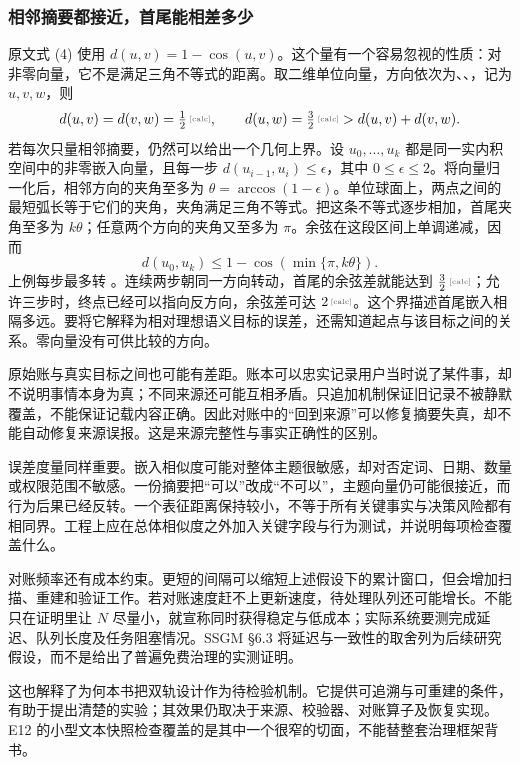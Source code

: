 \subsubsection{相邻摘要都接近，首尾能相差多少}

原文式 (4) 使用 $d(u,v)=1-\cos(u,v)$。这个量有一个容易忽视的性质：对非零向量，它不是满足三角不等式的距离。取二维单位向量，方向依次为、、，记为 $u,v,w$，则
\[
 d(u,v)=d(v,w)=\calcnum{\tfrac12},\qquad
 d(u,w)=\calcnum{\tfrac32}>d(u,v)+d(v,w).
\]
若每次只量相邻摘要，仍然可以给出一个几何上界。设 $u_0,\ldots,u_k$ 都是同一实内积空间中的非零嵌入向量，且每一步 $d(u_{i-1},u_i)\leq\epsilon$，其中 $0\leq\epsilon\leq 2$。将向量归一化后，相邻方向的夹角至多为 $\theta=\arccos(1-\epsilon)$。单位球面上，两点之间的最短弧长等于它们的夹角，夹角满足三角不等式\cite{schubert-cosine-2021}。把这条不等式逐步相加，首尾夹角至多为 $k\theta$；任意两个方向的夹角又至多为 $\pi$。余弦在这段区间上单调递减，因而
\[
 d(u_0,u_k)\leq 1-\cos\!\left(\min\{\pi,k\theta\}\right).
\]
上例每步最多转 。连续两步朝同一方向转动，首尾的余弦差就能达到 $\calcnum{\tfrac32}$；允许三步时，终点已经可以指向反方向，余弦差可达 $\calcnum{2}$。这个界描述首尾嵌入相隔多远。要将它解释为相对理想语义目标的误差，还需知道起点与该目标之间的关系。零向量没有可供比较的方向。

原始账与真实目标之间也可能有差距。账本可以忠实记录用户当时说了某件事，却不说明事情本身为真；不同来源还可能互相矛盾。只追加机制保证旧记录不被静默覆盖，不能保证记载内容正确。因此对账中的“回到来源”可以修复摘要失真，却不能自动修复来源误报。这是来源完整性与事实正确性的区别。

误差度量同样重要。嵌入相似度可能对整体主题很敏感，却对否定词、日期、数量或权限范围不敏感。一份摘要把“可以”改成“不可以”，主题向量仍可能很接近，而行为后果已经反转。一个表征距离保持较小，不等于所有关键事实与决策风险都有相同界。工程上应在总体相似度之外加入关键字段与行为测试，并说明每项检查覆盖什么。

对账频率还有成本约束。更短的间隔可以缩短上述假设下的累计窗口，但会增加扫描、重建和验证工作。若对账速度赶不上更新速度，待处理队列还可能增长。不能只在证明里让 $N$ 尽量小，就宣称同时获得稳定与低成本；实际系统要测完成延迟、队列长度及任务阻塞情况。SSGM §6.3 将延迟与一致性的取舍列为后续研究假设，而不是给出了普遍免费治理的实测证明。

这也解释了为何本书把双轨设计作为待检验机制。它提供可追溯与可重建的条件，有助于提出清楚的实验；其效果仍取决于来源、校验器、对账算子及恢复实现。E12 的小型文本快照检查覆盖的是其中一个很窄的切面，不能替整套治理框架背书。

